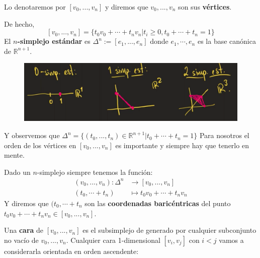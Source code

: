 \documentclass[spanish]{book}
\theoremstyle{definition}
\newcommand{\R}{\mathbb{R}}
\begin{document}
	Lo denotaremos por $[v_0,...,v_n]$ y diremos que 	 $v_0,...,v_n$ son sus \textbf{vértices}.
	
	De hecho, $$[v_0,...,v_n]=\{t_0v_0+\cdots+t_nv_n|t_i\geq0,t_0+\cdots+t_n=1\}$$
	El \textbf{$n$-simplejo estándar} es $\Delta^n:=[e_1,...,e_n]$ donde $e_1,\cdots,e_n$ es la base canónica de $\R^{n+1}$.
	
	\begin{figure}[H]
		\centering
		\includegraphics[width=0.7\linewidth]{Homología/H2.1.2}
	\end{figure}
	Y observemos que $\Delta^n=\{(t_0,...,t_n)\in\R^{n+1}|t_0+\cdots+t_n=1\}$
Para nosotros el orden de los vértices en $[v_0,...,v_n]$ es importante y siempre hay que tenerlo en mente.

Dado un $n$-simplejo siempre tenemos la función:
\begin{align*}
	(v_0,...,v_n):\Delta^n&\to[v_0,...,v_n]\\
	(t_0,\cdots+t_n)&\mapsto t_0v_0+\cdots+t_nv_n
\end{align*}
Y diremos que $(t_0,\cdots+t_n$ son las \textbf{coordenadas baricéntricas} del punto $t_0v_0+\cdots+t_nv_n\in[v_0,...,v_n]$.

Una \textbf{cara} de $[v_0,...,v_n]$ es el subsimplejo de generado por cualquier subconjunto no vacío de ${v_0,...,v_n}$. Cualquier cara 1-dimensional $[v_i,v_j]$ con $i<j$ vamos a considerarla orientada en orden ascendente:
\vspace*{.7cm}
\end{document}
